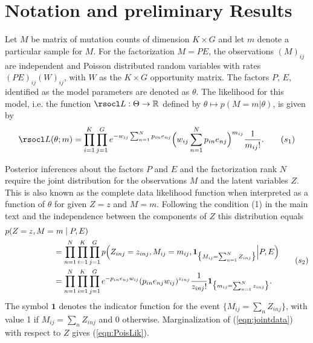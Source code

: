 \documentclass[11pt]{amsart}
\theoremstyle{definition}
\theoremstyle{remark}
\begin{document}
\tableofcontents 

\section{Notation and preliminary Results}
Let $M$ be matrix of mutation counts of dimension $K\times G$ and let
$m$ denote a particular sample for $M$. For the factorization $M=PE$,
the observations $(M)_{ij}$ are independent and Poisson distributed
random variables with rates $(PE)_{ij}(W)_{ij}$, with $W$ as the
$K\times G$ opportunity matrix. The factors $P$, $E$, identified as
the model parameters are denoted as $\theta$. The likelihood for this
model, i.e. the function $\rsocl L: \Theta \to \mathbb R$ defined by
$\theta \mapsto p(M=m|\theta)$, is given by
\begin{equation}
  \label{eqn:PoisLik}
   \rsocl L(\theta; m) 
   =
    \prod_{i=1}^K \prod_{j=1}^G e^{-w_{ij}\sum_{n=1}^{N}p_{in}e_{nj}}
    \Big(w_{ij}\sum_{n=1}^{N}p_{in}e_{nj}\Big)^{m_{ij}}
    \frac{1}{m_{ij}!}.\tag{$s_1$}
\end{equation}

Posterior inferences about the factors $P$ and $E$ and the
factorization rank $N$ require the joint distribution for the
observations $M$ and the latent variables $Z$. This is also known as
the complete data likelihood function when interpreted as a function
of  $\theta$ for given $Z=z$ and $M=m$. Following the condition 
(1) in the main text and the independence between
the components of $Z$ this distribution equals
\begin{equation}
   \label{eqn:jointdata}
 \begin{aligned}
    p(Z = z, M =&\ m \mid P, E) \notag\\
  &= 
    \prod_{n=1}^N\prod_{i=1}^K\prod_{j=1}^G p\Big(Z_{inj} = z_{inj},
    M_{ij} = m_{ij}, \mathbf{1}_{\big\{M_{ij} = \sum_{n=1}^N
      Z_{inj}\big\}} \Big| P, E\Big)  \notag\\ 
  &=
    \prod_{n=1}^N\prod_{i=1}^K\prod_{j=1}^G e^{-p_{in}e_{nj}w_{ij}}
    (p_{in}e_{nj}w_{ij})^{z_{inj}} \frac{1}{z_{inj}!}
    \mathbf{1}_{\big\{m_{ij} = \sum_{n=1}^N z_{inj}\big\}}.
 \end{aligned}
 \tag{$s_2$}
\end{equation}
The symbol $\mathbf{1}$ denotes the indicator function for the  
event $\big\{M_{ij} = \sum_n Z_{inj}\big\}$, with value 1 if $M_{ij} =  
\sum_n  Z_{inj}$ and 0 otherwise. Marginalization of
(\ref{eqn:jointdata}) with respect to $Z$ gives  (\ref{eqn:PoisLik}).
\end{document}
